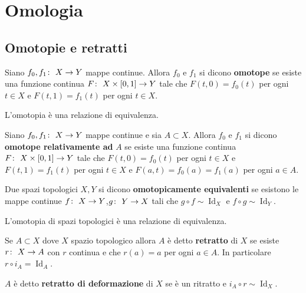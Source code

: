\chapter{Omologia}


\section{Omotopie e retratti}

\begin{definition}
	Siano $f_0, f_1 \colon\ X \rightarrow Y$ mappe continue. Allora $f_0$ e $f_1$ si dicono \textbf{omotope} se esiste una funzione continua $F \colon\ X \times \left[0,1\right] \rightarrow Y$ tale che $F(t,0) = f_0(t)$ per ogni $t \in X$ e $F(t,1) = f_1(t)$ per ogni $t \in X$.
\end{definition}

\begin{remark}
	L'omotopia è una relazione di equivalenza. 
\end{remark}

\begin{definition}
	Siano $f_0, f_1 \colon\ X \rightarrow Y$ mappe continue e sia $A \subset X$. Allora $f_0$ e $f_1$ si dicono \textbf{omotope relativamente ad} $A$ se esiste una funzione continua $F \colon\ X \times \left[0,1\right] \rightarrow Y$ tale che $F(t,0) = f_0(t)$ per ogni $t \in X$ e $F(t,1) = f_1(t)$ per ogni $t \in X$ e $F(a, t) = f_0(a) = f_1(a)$ per ogni $a \in A$.
\end{definition}

\begin{definition}
	Due spazi topologici $X,Y$ si dicono \textbf{omotopicamente equivalenti} se esistono le mappe continue $f \colon\ X \rightarrow Y$,$g \colon\ Y \rightarrow X$ tali che $g \circ f \sim \operatorname{Id}_X$ e $f \circ g \sim \operatorname{Id}_{Y}$. 
\end{definition}

\begin{remark}
	L'omotopia di spazi topologici è una relazione di equivalenza. 
\end{remark}

\begin{definition}
	Se $A \subset X$ dove $X$ spazio topologico allora $A$ è detto \textbf{retratto} di $X$ se esiste $r \colon\ X \rightarrow A$ con $r$ continua e che $r(a) = a$ per ogni $a \in A$. In particolare $r \circ i_A = \operatorname{Id}_{A}$.
\end{definition}

\begin{definition}
	$A$ è detto \textbf{retratto di deformazione} di $X$ se è un ritratto e $i_A \circ r \sim \operatorname{Id}_{X}$.
\end{definition}


